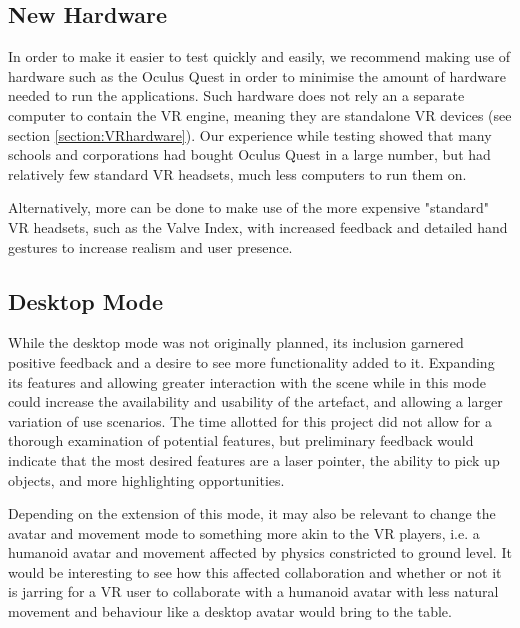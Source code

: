 \subsection{New Hardware}
In order to make it easier to test quickly and easily, we recommend making use of hardware such as the Oculus Quest \cite{hillmann2019comparing} in order to minimise the amount of hardware needed to run the applications. Such hardware does not rely an a separate computer to contain the VR engine, meaning they are standalone VR devices (see section \ref{section:VRhardware}). Our experience while testing showed that many schools and corporations had bought Oculus Quest in a large number, but had relatively few standard VR headsets, much less computers to run them on. 

Alternatively, more can be done to make use of the more expensive "standard" VR headsets, such as the Valve Index, with increased feedback and detailed hand gestures to increase realism and user presence.

\subsection{Desktop Mode}
While the desktop mode was not originally planned, its inclusion garnered positive feedback and a desire to see more functionality added to it. Expanding its features and allowing greater interaction with the scene while in this mode could increase the availability and usability of the artefact, and allowing a larger variation of use scenarios. The time allotted for this project did not allow for a thorough examination of potential features, but preliminary feedback would indicate that the most desired features are a laser pointer, the ability to pick up objects, and more highlighting opportunities.

Depending on the extension of this mode, it may also be relevant to change the avatar and movement mode to something more akin to the VR players, i.e. a humanoid avatar and movement affected by physics constricted to ground level. It would be interesting to see how this affected collaboration and whether or not it is jarring for a VR user to collaborate with a humanoid avatar with less natural movement and behaviour like a desktop avatar would bring to the table.


\cleardoublepage